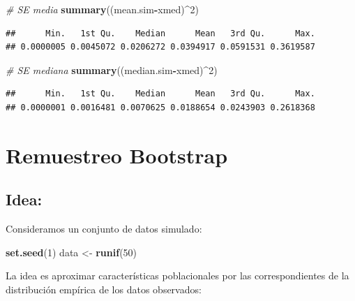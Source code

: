 \documentclass[]{book}
\newenvironment{Shaded}{\begin{snugshade}}{\end{snugshade}}
\newcommand{\KeywordTok}[1]{\textcolor[rgb]{0.13,0.29,0.53}{\textbf{#1}}}
\newcommand{\DecValTok}[1]{\textcolor[rgb]{0.00,0.00,0.81}{#1}}
\newcommand{\StringTok}[1]{\textcolor[rgb]{0.31,0.60,0.02}{#1}}
\newcommand{\CommentTok}[1]{\textcolor[rgb]{0.56,0.35,0.01}{\textit{#1}}}
\newcommand{\OperatorTok}[1]{\textcolor[rgb]{0.81,0.36,0.00}{\textbf{#1}}}
\newcommand{\NormalTok}[1]{#1}
\theoremstyle{definition}
\theoremstyle{definition}
\theoremstyle{definition}
\theoremstyle{remark}
\begin{document}
\begin{enumerate}
\begin{Shaded}
\begin{Highlighting}[]
\CommentTok{# SE media}
\KeywordTok{summary}\NormalTok{((mean.sim}\OperatorTok{-}\NormalTok{xmed)}\OperatorTok{^}\DecValTok{2}\NormalTok{) }
\end{Highlighting}
\end{Shaded}

\begin{verbatim}
##      Min.   1st Qu.    Median      Mean   3rd Qu.      Max. 
## 0.0000005 0.0045072 0.0206272 0.0394917 0.0591531 0.3619587
\end{verbatim}

\begin{Shaded}
\begin{Highlighting}[]
\CommentTok{# SE mediana}
\KeywordTok{summary}\NormalTok{((median.sim}\OperatorTok{-}\NormalTok{xmed)}\OperatorTok{^}\DecValTok{2}\NormalTok{) }
\end{Highlighting}
\end{Shaded}

\begin{verbatim}
##      Min.   1st Qu.    Median      Mean   3rd Qu.      Max. 
## 0.0000001 0.0016481 0.0070625 0.0188654 0.0243903 0.2618368
\end{verbatim}
\end{enumerate}

\section{Remuestreo Bootstrap}\label{remuestreo-bootstrap}

\subsection{Idea:}\label{idea}

Consideramos un conjunto de datos simulado:

\begin{Shaded}
\begin{Highlighting}[]
\KeywordTok{set.seed}\NormalTok{(}\DecValTok{1}\NormalTok{)}
\NormalTok{data <-}\StringTok{ }\KeywordTok{runif}\NormalTok{(}\DecValTok{50}\NormalTok{)}
\end{Highlighting}
\end{Shaded}

La idea es aproximar características poblacionales por las
correspondientes de la distribución empírica de los datos observados:
\end{document}
